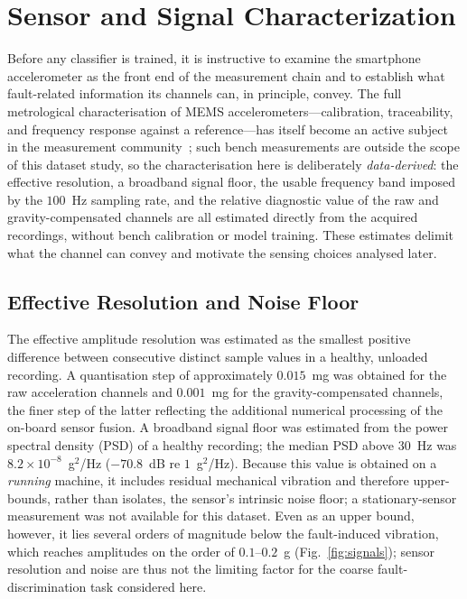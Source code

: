 
\section{Sensor and Signal Characterization}
\label{sec:charact}

Before any classifier is trained, it is instructive to examine the smartphone
accelerometer as the front end of the measurement chain and to establish what
fault-related information its channels can, in principle, convey. The full
metrological characterisation of MEMS accelerometers---calibration, traceability,
and frequency response against a reference---has itself become an active subject
in the measurement community~\cite{prato2021mems, schiavi2023mems, demilia2021mems};
such bench measurements are outside the scope of this dataset study, so the
characterisation here is deliberately \emph{data-derived}: the effective
resolution, a broadband signal floor, the usable frequency band imposed by the
$100$~Hz sampling rate, and the relative diagnostic value of the raw and
gravity-compensated channels are all estimated directly from the acquired
recordings, without bench calibration or model training. These estimates delimit
what the channel can convey and motivate the sensing choices analysed later.

\subsection{Effective Resolution and Noise Floor}
The effective amplitude resolution was estimated as the smallest positive
difference between consecutive distinct sample values in a healthy, unloaded
recording. A quantisation step of approximately $0.015$~mg was obtained for the
raw acceleration channels and $0.001$~mg for the gravity-compensated channels,
the finer step of the latter reflecting the additional numerical processing of
the on-board sensor fusion. A broadband signal floor was estimated from the
power spectral density (PSD) of a healthy recording; the median PSD above
$30$~Hz was $8.2\times10^{-8}$~g$^2$/Hz ($-70.8$~dB re $1$~g$^2$/Hz). Because this
value is obtained on a \emph{running} machine, it includes residual mechanical
vibration and therefore upper-bounds, rather than isolates, the sensor's
intrinsic noise floor; a stationary-sensor measurement was not available for this
dataset. Even as an upper bound, however, it lies several orders of magnitude
below the fault-induced vibration, which reaches amplitudes on the order of
$0.1$--$0.2$~g (Fig.~\ref{fig:signals}); sensor resolution and noise are thus not
the limiting factor for the coarse fault-discrimination task considered here.

